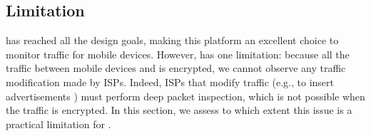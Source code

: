 \subsection{Limitation}
\platname {} has reached all the design goals, making this platform an
excellent choice to monitor traffic for mobile devices. However,
\platname{} has one limitation: because all the traffic between mobile
devices and \platname{} is encrypted, we cannot observe any traffic
modification made by ISPs. Indeed, ISPs that modify traffic (e.g., to insert
advertisements ) must perform deep packet
inspection, which is not possible when the traffic is encrypted.  In
this section, we assess to which extent this issue is a practical
limitation for \platname.



